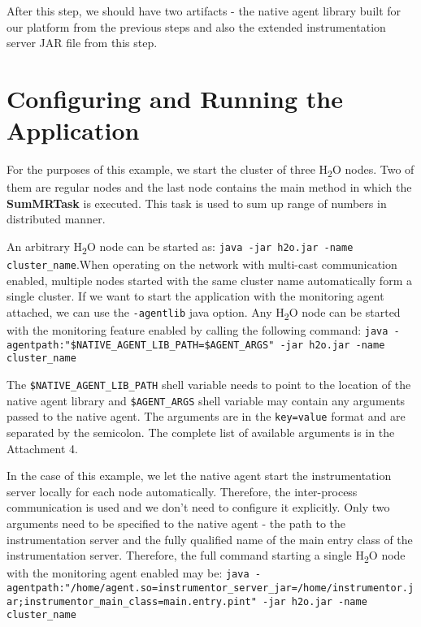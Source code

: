 After this step, we should have two artifacts - the native agent library built for our platform from the previous steps and also the extended instrumentation server JAR file from this step.
\section{Configuring and Running the Application}
For the purposes of this example, we start the cluster of three H\textsubscript{2}O nodes. Two of them are regular nodes and the last node contains the main method in which the \textbf{SumMRTask} is executed. This task is used to sum up range of numbers in distributed manner.

An arbitrary H\textsubscript{2}O node can be started as: \newline \texttt{java -jar h2o.jar -name cluster\_name}.\newline When operating on the network with multi-cast communication enabled, multiple nodes started with the same cluster name automatically form a single cluster. If we want to start the application with the monitoring agent attached, we can use the \texttt{-agentlib} java option. Any H\textsubscript{2}O node can be started with the monitoring feature enabled by calling the following command: \newline
\texttt{java -agentpath:"\$NATIVE\_AGENT\_LIB\_PATH=\$AGENT\_ARGS" -jar h2o.jar  \newline -name cluster\_name}

The \texttt{\$NATIVE\_AGENT\_LIB\_PATH} shell variable needs to point to the location of the native agent library and \texttt{\$AGENT\_ARGS} shell variable may contain any arguments passed to the native agent. The arguments are in the \texttt{key=value} format and are separated by the semicolon. The complete list of available arguments is in the Attachment 4.

In the case of this example, we let the native agent start the instrumentation server locally for each node automatically. Therefore, the inter-process communication is used and we don't need to configure it explicitly. Only two arguments need to be specified to the native agent - the path to the instrumentation server and the fully qualified name of the main entry class of the instrumentation server. Therefore, the full command starting a single H\textsubscript{2}O node with the monitoring agent enabled may be: \newline
\texttt{java -agentpath:"/home/agent.so=instrumentor\_server\_jar=\newline/home/instrumentor.jar;instrumentor\_main\_class=main.entry.pint" \newline-jar h2o.jar -name cluster\_name}

